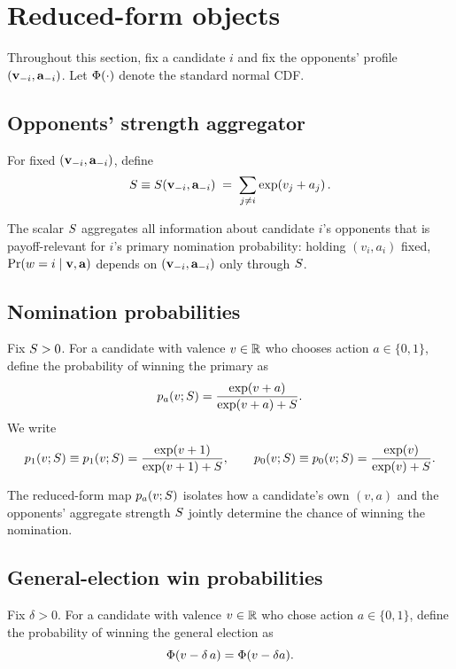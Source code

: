 \section*{Reduced-form objects}

Throughout this section, fix a candidate $i$ and fix the opponents' profile $(\mathbf v_{-i},\mathbf a_{-i})$.
Let $\Phi(\cdot)$ denote the standard normal CDF.

\subsection*{Opponents' strength aggregator}
\begin{definition}\label{def:Sof}
For fixed $(\mathbf v_{-i},\mathbf a_{-i})$, define
\[
    S \equiv S\!\left(\mathbf v_{-i},\mathbf a_{-i}\right) \;=\; \sum_{j\neq i} \exp\!\left(v_j + a_j\right).
\]
\end{definition}

\begin{remark*}
The scalar $S$ aggregates all information about candidate $i$'s opponents that is payoff-relevant for $i$'s primary nomination probability: holding $(v_i,a_i)$ fixed, $\Pr(w=i\mid\mathbf v,\mathbf a)$ depends on $(\mathbf v_{-i},\mathbf a_{-i})$ only through $S$.
\end{remark*}

\subsection*{Nomination probabilities}
\begin{definition}\label{def:pnomRF}
Fix $S>0$. For a candidate with valence $v\in\mathbb{R}$ who chooses action $a\in\{0,1\}$, define the probability of winning the primary as
\[
    p_{a}\!\left(v;S\right) = \frac{\exp\!\left(v+a\right)}{\exp\!\left(v+a\right)+S}.
\]
We write
\[
    \pOne{v}{\Sagg} \equiv \pnom{1}{v}{\Sagg} = \pOneRF{v}{\Sagg},
    \qquad
    \pZero{v}{\Sagg} \equiv \pnom{0}{v}{\Sagg} = \pZeroRF{v}{\Sagg}.
\]
\end{definition}

\begin{remark*}
The reduced-form map $p_{a}\!\left(v;S\right)$ isolates how a candidate's own $(v,a)$ and the opponents' aggregate strength $S$ jointly determine the chance of winning the nomination.
\end{remark*}

\subsection*{General-election win probabilities}
\begin{definition}\label{def:PgeRF}
Fix $\delta>0$. For a candidate with valence $v\in\mathbb{R}$ who chose action $a\in\{0,1\}$, define the probability of winning the general election as
\[
    \Phi\!\left(v-\delta\,a\right) = \Phi(v-\delta a).
\]
\end{definition}

